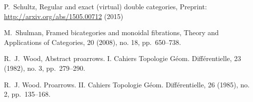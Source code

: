 \documentclass[11pt,oneside,article]{memoir}
\begin{document}
\begin{thebibliography}{XXX}
 P.~Schultz, Regular and exact (virtual) double categories, Preprint: \url{http://arxiv.org/abs/1505.00712} (2015)

 M.~Shulman, Framed bicategories and monoidal fibrations, Theory and Applications of Categories, 20 (2008), no. 18, pp.~650--738.



 R.~J.~Wood, Abstract proarrows. I. Cahiers Topologie G\'{e}om. Diff\'{e}rentielle, 23 (1982), no. 3, pp.~279--290.

 R.~J. Wood. Proarrows. II. Cahiers Topologie G\'{e}om. Diff\'{e}rentielle, 26 (1985), no. 2, pp.~135--168.

\end{thebibliography}
\end{document}
